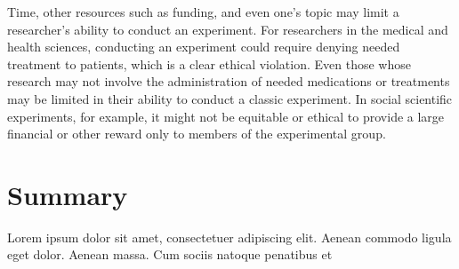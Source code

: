 Time, other resources such as funding, and even one's topic may limit a researcher's ability to conduct an experiment. For researchers in the medical and health sciences, conducting an experiment could require denying needed treatment to patients, which is a clear ethical violation. Even those whose research may not involve the administration of needed medications or treatments may be limited in their ability to conduct a classic experiment. In social scientific experiments, for example, it might not be equitable or ethical to provide a large financial or other reward only to members of the experimental group. 

\section{Summary}\label{ch09:summary}

Lorem ipsum dolor sit amet, consectetuer adipiscing elit. Aenean commodo ligula eget dolor. Aenean massa. Cum sociis natoque penatibus et
